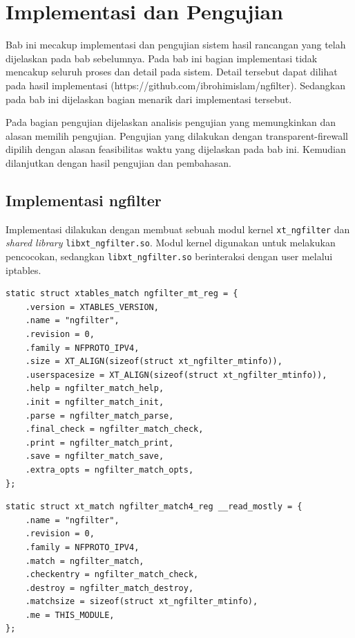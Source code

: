 \chapter{Implementasi dan Pengujian}

Bab ini mecakup implementasi dan pengujian sistem hasil rancangan yang telah dijelaskan pada bab sebelumnya. Pada bab ini bagian implementasi tidak mencakup seluruh proses dan detail pada sistem. Detail tersebut dapat dilihat pada hasil implementasi (https://github.com/ibrohimislam/ngfilter). Sedangkan pada bab ini dijelaskan bagian menarik dari implementasi tersebut.

Pada bagian pengujian dijelaskan analisis pengujian yang memungkinkan dan alasan memilih pengujian. Pengujian yang dilakukan dengan transparent-firewall dipilih dengan alasan feasibilitas waktu yang dijelaskan pada bab ini. Kemudian dilanjutkan dengan hasil pengujian dan pembahasan.

\section{Implementasi ngfilter}

Implementasi dilakukan dengan membuat sebuah modul kernel \verb|xt_ngfilter| dan  \textit{shared library} \verb|libxt_ngfilter.so|.
Modul kernel digunakan untuk melakukan pencocokan, sedangkan \verb|libxt_ngfilter.so| berinteraksi dengan user melalui iptables.

\begin{lstlisting}
static struct xtables_match ngfilter_mt_reg = {
	.version = XTABLES_VERSION,
	.name = "ngfilter",
	.revision = 0,
	.family = NFPROTO_IPV4,
	.size = XT_ALIGN(sizeof(struct xt_ngfilter_mtinfo)),
	.userspacesize = XT_ALIGN(sizeof(struct xt_ngfilter_mtinfo)),
	.help = ngfilter_match_help,
	.init = ngfilter_match_init,
	.parse = ngfilter_match_parse,
	.final_check = ngfilter_match_check,
	.print = ngfilter_match_print,
	.save = ngfilter_match_save,
	.extra_opts = ngfilter_match_opts,
};
\end{lstlisting}

\begin{lstlisting}
static struct xt_match ngfilter_match4_reg __read_mostly = {
	.name = "ngfilter",
	.revision = 0,
	.family = NFPROTO_IPV4,
	.match = ngfilter_match,
	.checkentry = ngfilter_match_check,
	.destroy = ngfilter_match_destroy,
	.matchsize = sizeof(struct xt_ngfilter_mtinfo),
	.me = THIS_MODULE,
};
\end{lstlisting}

